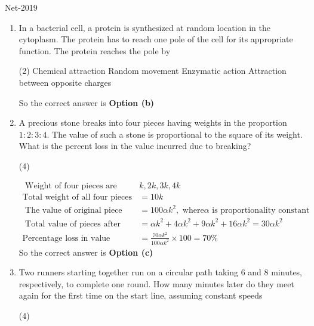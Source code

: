 \begin{abox}
	Net-2019 
\end{abox}
\begin{enumerate}
	\item In a bacterial cell, a protein is synthesized at random location in the cytoplasm. The protein has to reach one pole of the cell for its appropriate function. The protein reaches the pole by
	 \begin{tasks}(2)
		\task[\textbf{a.}]Chemical attraction
		\task[\textbf{b.}]Random movement
		\task[\textbf{c.}]Enzymatic action
		\task[\textbf{d.}] Attraction between opposite charges
	\end{tasks}
\begin{answer}
	So the correct answer is \textbf{Option (b)}
\end{answer}
	\item A precious stone breaks into four pieces having weights in the proportion $1: 2: 3: 4$. The value of such a stone is proportional to the square of its weight. What is the percent loss in the value incurred due to breaking?
	 \begin{tasks}(4)
	\end{tasks}
\begin{answer}
	\begin{align*}
	\text{ Weight of four pieces are }&k, 2 k, 3 k, 4 k\\
	\text{Total weight of all four pieces }&=10 k\\
\text{	The value of original piece }&=100 \alpha k^{2},\text{ where} \alpha\text{ is proportionality constant}\\
\text{	Total value of pieces after breaking }&=\alpha k^{2}+4 \alpha k^{2}+9 \alpha k^{2}+16 \alpha k^{2}=30 \alpha k^{2}\\
	\text{Percentage loss in value }&=\frac{70 \alpha k^{2}}{100 \alpha k^{2}} \times 100=70 \%
	\end{align*}
	So the correct answer is \textbf{Option (c)}
\end{answer}
	\item Two runners starting together run on a circular path taking 6 and 8 minutes, respectively, to complete one round. How many minutes later do they meet again for the first time on the start line, assuming constant speeds
	 \begin{tasks}(4)
	\end{tasks}

\end{enumerate}
